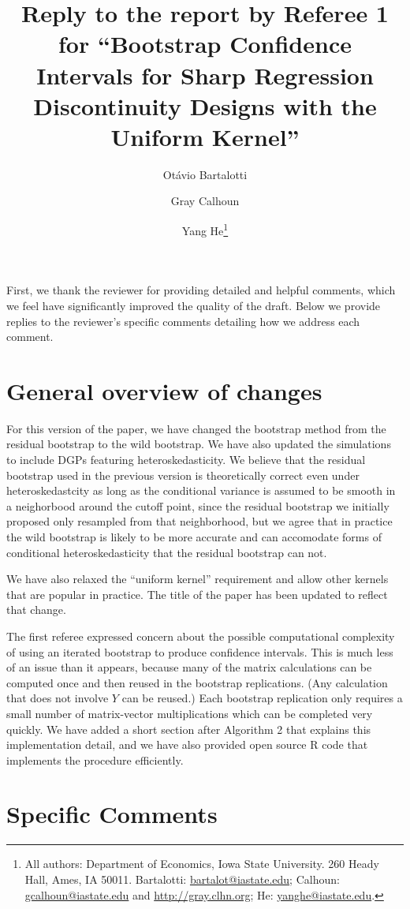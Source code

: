 \documentclass[12pt,fleqn]{article}
\title{Reply to the report by Referee 1 for ``Bootstrap Confidence Intervals for Sharp Regression Discontinuity Designs
  with the Uniform Kernel''}
\author{Ot\'avio Bartalotti \and Gray Calhoun \and Yang He\thanks{%
  All authors: Department of Economics, Iowa State University.
  260 Heady Hall, Ames, IA 50011.
  Bartalotti: \protect\url{bartalot@iastate.edu};
  Calhoun: \protect\url{gcalhoun@iastate.edu} and
  \protect\url{http://gray.clhn.org};
  He: \protect\url{yanghe@iastate.edu}.}}
\begin{document}
\maketitle

First, we thank the reviewer for providing detailed and helpful comments, which
we feel have significantly improved the quality of the draft.  Below we provide
replies to the reviewer's specific comments detailing how we address each
comment.

\section{General overview of changes}

For this version of the paper, we have changed the bootstrap method from the
residual bootstrap to the wild bootstrap. We have also updated the simulations
to include DGPs featuring heteroskedasticity. We believe that the residual
bootstrap used in the previous version is theoretically correct even under
heteroskedastcity as long as the conditional variance is assumed to be smooth in
a neighorbood around the cutoff point, since the residual bootstrap we initially
proposed only resampled from that neighborhood, but we agree that in practice
the wild bootstrap is likely to be more accurate and can accomodate forms of
conditional heteroskedasticity that the residual bootstrap can not.

We have also relaxed the ``uniform kernel'' requirement and allow other kernels
that are popular in practice. The title of the paper has been updated to reflect
that change.

The first referee expressed concern about the possible computational complexity of
using an iterated bootstrap to produce confidence intervals. This is much less
of an issue than it appears, because many of the matrix calculations can be
computed once and then reused in the bootstrap replications. (Any calculation
that does not involve $Y$ can be reused.) Each bootstrap replication only
requires a small number of matrix-vector multiplications which can be completed
very quickly. We have added a short section after Algorithm 2 that explains
this implementation detail, and we have also provided open source R code that
implements the procedure efficiently.

\section{Specific Comments}
\end{document}
